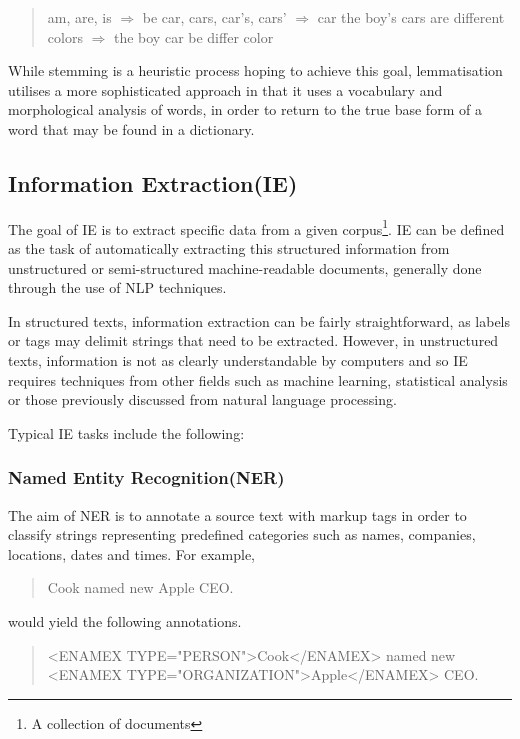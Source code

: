 \begin{quote}
am, are, is \begin{math}\Rightarrow\end{math} be 
\newline
car, cars, car's, cars' \begin{math}\Rightarrow\end{math} car
\newline
\newline
the boy's cars are different colors  \begin{math}\Rightarrow \end{math}
\newline
the boy car be differ color
\end{quote}

While stemming is a heuristic process hoping to achieve this goal, lemmatisation utilises a more sophisticated approach in that it uses a vocabulary and morphological analysis of words, in order to return to the true base form of a word that may be found in a dictionary.

\subsection[Information Extraction]{Information Extraction(IE)}
The goal of IE is to extract specific data from a given corpus\footnote{A collection of documents}. IE can be defined as the task of automatically extracting this structured information from unstructured or semi-structured machine-readable documents, generally done through the use of NLP techniques.

In structured texts, information extraction can be fairly straightforward, as labels or tags may delimit strings that need to be extracted\cite{soderland99}. However, in unstructured texts, information is not as clearly understandable by computers and so IE requires techniques from other fields such as machine learning, statistical analysis or those previously discussed from natural language processing.

Typical IE tasks include the following:

\subsubsection{Named Entity Recognition(NER)}
The aim of NER is to annotate a source text with markup tags in order to classify strings representing predefined categories such as names, companies, locations, dates and times. For example,
\begin{quote}
Cook named new Apple CEO.
\end{quote}
would yield the following annotations.
\begin{quote}
<ENAMEX TYPE="PERSON">Cook</ENAMEX> named new
\newline
<ENAMEX TYPE="ORGANIZATION">Apple</ENAMEX> CEO.
\end{quote}

